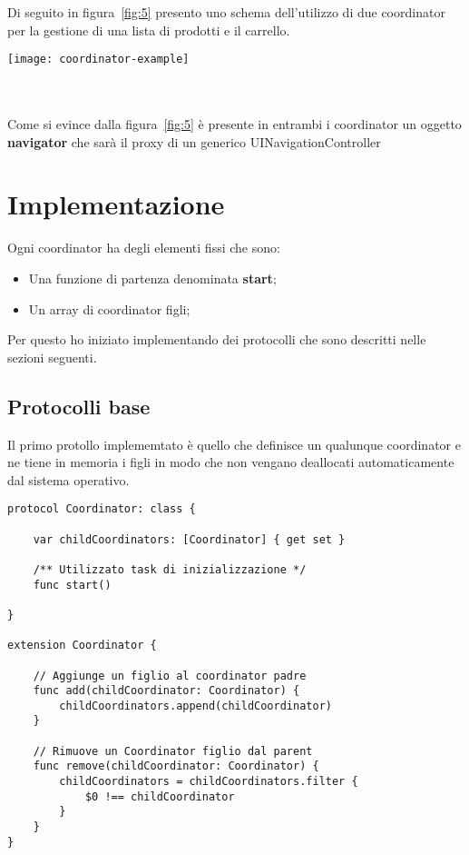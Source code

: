 Di seguito in figura~\ref{fig:5} presento uno schema dell'utilizzo di due coordinator
per la gestione di una lista di prodotti e il carrello. \\

\begin{minipage}{\linewidth}
    \centering
    \texttt{[image: coordinator-example]}
    \label{fig:5}
\end{minipage} \\\\

Come si evince dalla figura~\ref{fig:5} è presente in entrambi i coordinator un oggetto
\textbf{navigator} che sarà il proxy di un generico UINavigationController

\section{Implementazione}

Ogni coordinator ha degli elementi fissi che sono:

\begin{itemize}
    \item Una funzione di partenza denominata \textbf{start};
    \item Un array di coordinator figli;
\end{itemize}

Per questo ho iniziato implementando dei protocolli che sono descritti nelle sezioni seguenti.
\subsection{Protocolli base}

Il primo protollo implememtato è quello che definisce un qualunque coordinator
e ne tiene in memoria i figli in modo che non vengano
deallocati automaticamente dal sistema operativo.

\begin{verbatim}
protocol Coordinator: class {

    var childCoordinators: [Coordinator] { get set }
    
    /** Utilizzato task di inizializzazione */
    func start()
    
}

extension Coordinator {
    
    // Aggiunge un figlio al coordinator padre
    func add(childCoordinator: Coordinator) {
        childCoordinators.append(childCoordinator)
    }
    
    // Rimuove un Coordinator figlio dal parent
    func remove(childCoordinator: Coordinator) {
        childCoordinators = childCoordinators.filter {
            $0 !== childCoordinator 
        }
    }
}
\end{verbatim}

